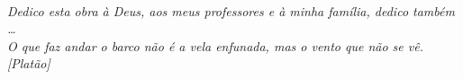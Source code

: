 \newpage\clearpage\pagebreak
\pagestyle{plain}
~\vfill
\begin{flushright}
    \textit{Dedico esta obra à Deus, aos meus professores e à minha família, dedico também \ldots} \\

    \vspace{1cm}
    \textit{O que faz andar o barco não é a vela enfunada, mas o vento que não se vê.~
[Platão]}
\end{flushright}

